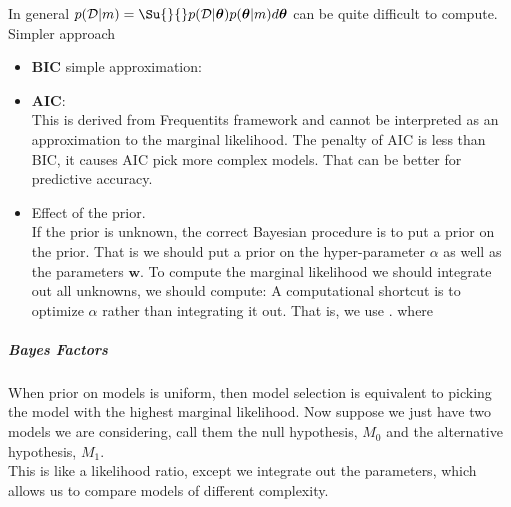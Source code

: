 In general $p(\mathcal{D}|m) = \Su{}{}p(\mathcal{D}|\bm{\theta})p(\bm{\theta}|m)d\bm{
\theta}$ can be quite difficult to compute. 
Simpler approach
\begin{itemize}
	\item \textbf{BIC} simple approximation:
	\item \textbf{AIC}:
		\\
		This is derived from Frequentits framework and cannot be interpreted as 
		an approximation to the marginal likelihood. The penalty of AIC is less
		than BIC, it causes AIC pick more complex models. That can be better for 
		predictive accuracy.
	\item Effect of the prior.\\
		If the prior is unknown, the correct Bayesian procedure is to put a prior
		on the prior. That is we should put a prior on the hyper-parameter 
		$\alpha$ as well as the parameters $\bm{w}$. To compute the marginal 
		likelihood we should integrate out all unknowns, we should compute:
		A computational shortcut is to optimize $\alpha$ rather than integrating
		it out. That is, we use .
		where 
\end{itemize}
\subparagraph{Bayes Factors}
When prior on models is uniform, then model selection is equivalent to picking the model
with the highest marginal likelihood. Now suppose we just have two models we are 
considering, call them the null hypothesis, $M_{0}$ and the alternative hypothesis,
$M_{1}$.\\
This is like a likelihood ratio, except we integrate out the parameters, which allows us
to compare models of different complexity. 
